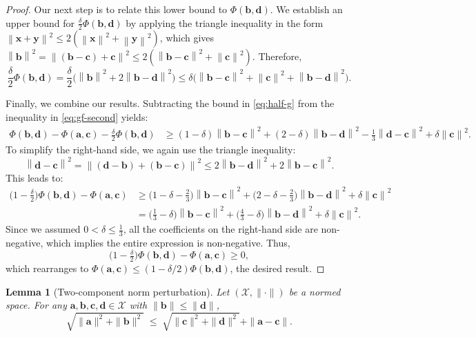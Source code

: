 \documentclass[letterpaper,11pt]{article}
\newcommand{\parenth}[1]{\left( #1 \right)}
\newcommand{\norm}[1]{\left\| #1 \right\|}
\newcommand{\vect}[1]{\mathbf{#1}}
\newtheorem{lemma}{Lemma}
\begin{document}
\begin{proof}
Our next step is to relate this lower bound to $\Phi(\vect{b}, \vect{d})$. We establish an upper bound for $\frac{\delta}{2} \Phi(\vect{b}, \vect{d})$ by applying the triangle inequality in the form $\norm{\vect{x}+\vect{y}}^2 \le 2(\norm{\vect{x}}^2 + \norm{\vect{y}}^2)$, which gives $\norm{\vect{b}}^2 = \norm{(\vect{b}-\vect{c})+\vect{c}}^2 \le 2(\norm{\vect{b}-\vect{c}}^2 + \norm{\vect{c}}^2)$. Therefore,
\begin{equation}\label{eq:half-g}
\frac{\delta}{2} \Phi(\vect{b}, \vect{d}) = \frac{\delta}{2}\bigl(\norm{\vect{b}}^{2}+2\norm{\vect{b}-\vect{d}}^{2}\bigr) \le \delta\bigl(\norm{\vect{b}-\vect{c}}^{2}+\norm{\vect{c}}^{2}+\norm{\vect{b}-\vect{d}}^{2}\bigr).
\end{equation}

Finally, we combine our results. Subtracting the bound in \cref{eq:half-g} from the inequality in \cref{eq:gf-second} yields:
\begin{align*}
\Phi(\vect{b}, \vect{d}) - \Phi(\vect{a}, \vect{c}) - \tfrac{\delta}{2} \Phi(\vect{b}, \vect{d}) &\ge (1-\delta)\norm{\vect{b}-\vect{c}}^{2} + (2-\delta)\norm{\vect{b}-\vect{d}}^{2} - \frac{1}{3}\norm{\vect{d}-\vect{c}}^{2} + \delta \norm{\vect{c}}^{2}.
\end{align*}
To simplify the right-hand side, we again use the triangle inequality:
\[
\norm{\vect{d}-\vect{c}}^{2}
=
\norm{(\vect{d}-\vect{b})+(\vect{b}-\vect{c})}^2
\le
2\norm{\vect{b}-\vect{d}}^{2}
+2\norm{\vect{b}-\vect{c}}^{2}.
\]
This leads to:
\begin{align*}
\bigl(1 - \tfrac{\delta}{2}\bigr)\Phi(\vect{b}, \vect{d}) - \Phi(\vect{a}, \vect{c}) &\ge \bigl(1-\delta - \tfrac{2}{3}\bigr)\norm{\vect{b}-\vect{c}}^{2} + \bigl(2-\delta - \tfrac{2}{3}\bigr)\norm{\vect{b}-\vect{d}}^{2}+\delta \norm{\vect{c}}^{2} \\
&= \bigl(\tfrac{1}{3}-\delta\bigr)\norm{\vect{b}-\vect{c}}^{2} + \bigl(\tfrac{4}{3}-\delta\bigr)\norm{\vect{b}-\vect{d}}^{2}+\delta \norm{\vect{c}}^{2}.
\end{align*}
Since we assumed $0 < \delta \le \frac{1}{3}$, all the coefficients on the right-hand side are non-negative, which implies the entire expression is non-negative. Thus,
\[
\bigl(1 - \tfrac{\delta}{2}\bigr)\Phi(\vect{b}, \vect{d}) - \Phi(\vect{a}, \vect{c}) \ge 0,
\]
which rearranges to $\Phi(\vect{a}, \vect{c}) \le \parenth{1 - \delta/2}\Phi(\vect{b}, \vect{d})$, the desired result.
\end{proof}

\begin{lemma}[Two-component norm perturbation]\label{lem:omd-sqrt-perturb}
Let $(\mathcal{X},\|\cdot\|)$ be a normed space.
For any $\vect{a},\vect{b},\vect{c},\vect{d}\in\mathcal{X}$ with $\|\vect{b}\|\le\|\vect{d}\|$,
\[
\sqrt{\|\vect{a}\|^{2}+\|\vect{b}\|^{2}}
\;\le\;
\sqrt{\|\vect{c}\|^{2}+\|\vect{d}\|^{2}}
+\|\vect{a}-\vect{c}\|.
\]
\end{lemma}
\end{document}
